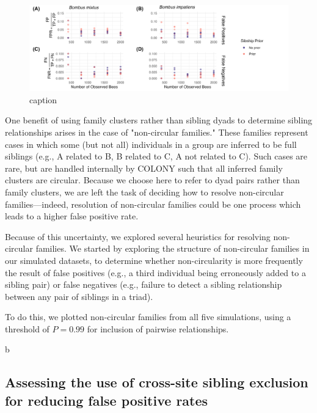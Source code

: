 \documentclass[12pt]{article}
\begin{document}
\begin{figure}[H]
    \centering
    \includegraphics[width=\linewidth]{appendix_figures/sibprior_dyads.jpg}
    \caption{caption}
    \label{fig:sibprior_dyads}
\end{figure}

One benefit of using family clusters rather than sibling dyads to determine sibling relationships arises in the case of "non-circular families." These families represent cases in which some (but not all) individuals in a group are inferred to be full siblings (e.g., A related to B, B related to C, A not related to C). Such cases are rare, but are handled internally by COLONY such that all inferred family clusters are circular. Because we choose here to refer to dyad pairs rather than family clusters, we are left the task of deciding how to resolve non-circular families---indeed, resolution of non-circular families could be one process which leads to a higher false positive rate.

Because of this uncertainty, we explored several heuristics for resolving non-circular families. We started by exploring the structure of non-circular families in our simulated datasets, to determine whether non-circularity is more frequently the result of false positives (e.g., a third individual being erroneously added to a sibling pair) or false negatives (e.g., failure to detect a sibling relationship between any pair of siblings in a triad).

To do this, we plotted non-circular families from all five simulations, using a threshold of $P = 0.99$ for inclusion of pairwise relationships.

b

\subsection{Assessing the use of cross-site sibling exclusion for reducing false positive rates}
\end{document}
